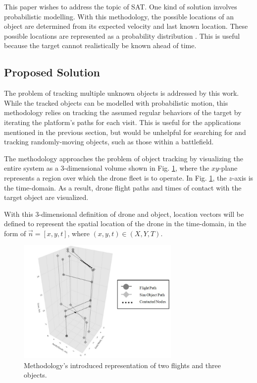 \documentclass[conf]{new-aiaa}
\begin{document}
This paper wishes to address the topic of SAT. One kind of solution involves probabilistic modelling. With this methodology, the possible locations of an object are determined from its expected velocity and last known location. These possible locations are represented as a probability distribution \cite{probabilisticSearch}. This is useful because the target cannot realistically be known ahead of time.


\subsection{Proposed Solution}
The problem of tracking multiple unknown objects is addressed by this work. While the tracked objects can be modelled with probabilistic motion, this methodology relies on tracking the assumed regular behaviors of the target by iterating the platform's paths for each visit. This is useful for the applications mentioned in the previous section, but would be unhelpful for searching for and tracking randomly-moving objects, such as those within a battlefield.

The methodology approaches the problem of object tracking by visualizing the entire system as a 3-dimensional volume shown in Fig. \ref{initial-flight}, where the $xy$-plane represents a region over which the drone fleet is to operate. In Fig. \ref{initial-flight}, the $z$-axis is the time-domain. As a result, drone flight paths and times of contact with the target object are visualized. 

With this 3-dimensional definition of drone and object, location vectors will be defined to represent the spatial location of the drone in the time-domain, in the form of $\vec{n}=[x, y, t]$, where $(x, y, t) \in (X, Y, T)$.

\begin{figure}[hbt!]
\centering
\includegraphics[width=0.7\textwidth]{figs/initial-flight}
\caption{Methodology's introduced representation of two flights and three objects.}
\label{initial-flight}
\end{figure}
\end{document}

